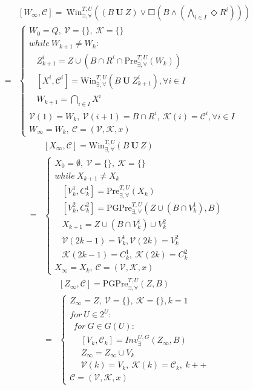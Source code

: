 \begin{align}
&[W_{\infty},\mathcal{C}]= \ \text{Win}_{\exists,\forall}^{T,U}((B\mathbf{\ U\ }Z)\vee \Square (B\wedge(\bigwedge_{i\in I}\Diamond R^i)) )\\
=&\begin{cases}
W_0 = Q,\ \mathcal{V}=\{\},\ \mathcal{K}=\{\}\\
while\ W_{k+1}\not= W_k:\\
\ \ \ \ Z_{k+1}^i = Z\cup (B\cap R^i\cap \text{Pre}_{\exists, \forall}^{T,U}(W_k))\\
\ \ \ \ [X^i, \mathcal{C}^i]= \text{Win}_{\exists,\forall}^{T,U} (B\mathbf{\ U\ }Z_{k+1}^i), \forall i \in I\\
\ \ \ \ W_{k+1} = \bigcap_{i\in I} X^i\\
\mathcal{V}(1)=W_k,\ \mathcal{V}(i+1) = B\cap R^i,\ 
\mathcal{K}(i) = \mathcal{C}^i, \forall i\in I\\
W_{\infty} = W_k,\ \mathcal{C} = (\mathcal{V},\mathcal{K},x)
\end{cases}\label{win_interm}
\end{align}
\begin{align}
&[X_{\infty},\mathcal{C}]= \text{Win}_{\exists,\forall}^{T,U} (B\mathbf{\ U\ }Z)\\
=&\begin{cases}
X_0 = \emptyset,\ \mathcal{V}=\{\},\ \mathcal{K}=\{\}\\
while\ X_{k+1}\not= X_k\\
\ \ \ \ [V^1_k,C^1_k]=
\text{Pre}_{\exists,\forall}^{T,U}(X_k)\\
\ \ \ \  [V^2_k,C^2_k]=\text{PGPre}_{\exists,\forall}^{T,U}(Z\cup(B\cap V^1_k),B)\\
\ \ \ \ X_{k+1} =Z\cup (B\cap V^1_k)\cup V^2_k\\
\ \ \ \ \mathcal{V}(2k-1)=V^1_k, \mathcal{V}(2k)=V^2_k\\
\ \ \ \ \mathcal{K}(2k-1)=C^1_k,\ \mathcal{K}(2k)=C^2_k\\
X_{\infty}=X_k,\ \mathcal{C} = (\mathcal{V},\mathcal{K},x)
\end{cases}\label{win_until}
\end{align}
\begin{align}
&[Z_{\infty},\mathcal{C}]=\text{PGPre}_{\exists,\forall}^{T,U} (Z,B)\\
=&\begin{cases}
Z_{\infty} = Z,\ \mathcal{V} = \{\},\ \mathcal{K}=\{\}, k = 1\\
for\ U\in 2^U:\\
\ \ for\ G\in G(U):\\
\ \ \ \ \ \  [V_k,\mathcal{C}_k]=Inv_{\exists}^{U,G}(Z_{\infty},B)\\
\ \ \ \ \ \ Z_{\infty} = Z_{\infty} \cup V_k\\
\ \ \ \ \ \ \mathcal{V}(k)=V_k,\ \mathcal{K}(k)=\mathcal{C}_k,\ k++\\
\mathcal{C} = (\mathcal{V},\mathcal{K},x)
\end{cases}\label{win_pgpre}
\end{align}
